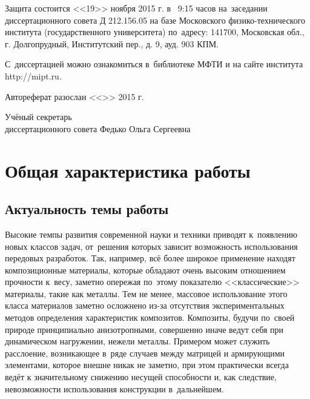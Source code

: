 \documentclass[a4paper,14pt]{extarticle}
\numberwithin{equation}{section}
\begin{document}
    \noindent
    Защита состоится <<19>> ноября 2015 г. в~ 9:15 часов на~заседании
    диссертационного совета Д 212.156.05 на базе Московского физико-технического
    института (государственного университета) по~адресу:
    141700, Московская обл., г. Долгопрудный, Институтский пер., д. 9, ауд.
    903 КПМ.

    \vspace{1em}

    \noindent
    С~диссертацией можно ознакомиться в~библиотеке МФТИ и на сайте института http://mipt.ru.

    \vspace{1em}

    \noindent
    Автореферат разослан <<\underline{\hspace{0.75cm}}>> \underline{\hspace{2cm}} 2015 г.

    \vspace{\fill}

    \noindent
    Учёный секретарь\\диссертационного совета \hspace{5cm}Федько Ольга Сергеевна

    \newpage
    \setcounter{page}{3}

    \section*{Общая характеристика работы}
    \subsection*{Актуальность темы работы}

    Высокие темпы развития современной науки и техники приводят к~появлению новых классов задач, от~решения которых
    зависит возможность использования передовых разработок. Так, например, всё более широкое применение находят
    композиционные материалы, которые обладают очень высоким отношением прочности к~весу, заметно опережая по~этому
    показателю <<классические>> материалы, такие как металлы. Тем не менее, массовое использование этого класса
    материалов заметно осложнено из-за отсутствия экспериментальных методов определения характеристик
    композитов. Композиты, будучи по~своей природе принципиально анизотропными, совершенно иначе ведут себя при
    динамическом нагружении, нежели металлы. Примером может служить расслоение, возникающее в~ряде случаев между
    матрицей и армирующими элементами, которое внешне никак не заметно, при этом практически всегда ведёт к
    значительному снижению несущей способности и, как следствие, невозможности использования конструкции в~дальнейшем.
\end{document}
